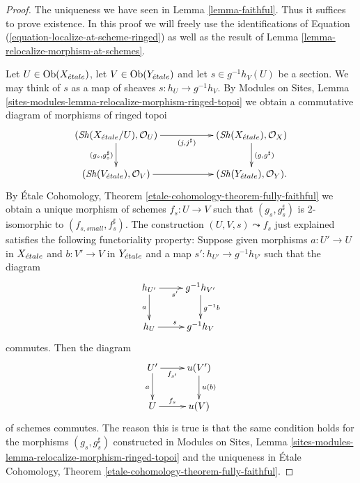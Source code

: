 \begin{proof}
The uniqueness we have seen in
Lemma \ref{lemma-faithful}.
Thus it suffices to prove existence.
In this proof we will freely use the identifications of
Equation (\ref{equation-localize-at-scheme-ringed})
as well as the result of
Lemma \ref{lemma-relocalize-morphism-at-schemes}.

\medskip\noindent
Let $U \in \mathop{\mathrm{Ob}}\nolimits(X_{\acute{e}tale})$, let
$V \in \mathop{\mathrm{Ob}}\nolimits(Y_{\acute{e}tale})$
and let $s \in g^{-1}h_V(U)$ be a section. We may think of
$s$ as a map of sheaves $s : h_U \to g^{-1}h_V$. By
Modules on Sites,
Lemma \ref{sites-modules-lemma-relocalize-morphism-ringed-topoi}
we obtain a commutative diagram of morphisms of ringed topoi
$$
\xymatrix{
(\Sh(X_\etale/U), \mathcal{O}_U)
\ar[rr]_-{(j, j^\sharp)} \ar[d]_{(g_s, g_s^\sharp)} & &
(\Sh(X_\etale), \mathcal{O}_X) \ar[d]^{(g, g^\sharp)} \\
(\Sh(V_\etale), \mathcal{O}_V) \ar[rr] & &
(\Sh(Y_\etale), \mathcal{O}_Y).
}
$$
By
\'Etale Cohomology, Theorem \ref{etale-cohomology-theorem-fully-faithful}
we obtain a unique morphism of schemes $f_s : U \to V$ such that
$(g_s, g_s^\sharp)$ is $2$-isomorphic to $(f_{s, small}, f_s^\sharp)$.
The construction $(U, V, s) \leadsto f_s$ just explained satisfies
the following functoriality property: Suppose given morphisms
$a : U' \to U$ in $X_{\acute{e}tale}$ and $b : V' \to V$ in $Y_{\acute{e}tale}$
and a map $s' : h_{U'} \to g^{-1}h_{V'}$ such that the diagram
$$
\xymatrix{
h_{U'} \ar[d]_a \ar[r]_{s'} & g^{-1}h_{V'} \ar[d]^{g^{-1}b} \\
h_U \ar[r]^s & g^{-1}h_V
}
$$
commutes. Then the diagram
$$
\xymatrix{
U' \ar[r]_-{f_{s'}} \ar[d]_a & u(V') \ar[d]^{u(b)} \\
U \ar[r]^-{f_s} & u(V)
}
$$
of schemes commutes. The reason this is true is that the same condition
holds for the morphisms $(g_s, g_s^\sharp)$ constructed in
Modules on Sites,
Lemma \ref{sites-modules-lemma-relocalize-morphism-ringed-topoi}
and the uniqueness in
\'Etale Cohomology, Theorem \ref{etale-cohomology-theorem-fully-faithful}.


\end{proof}
